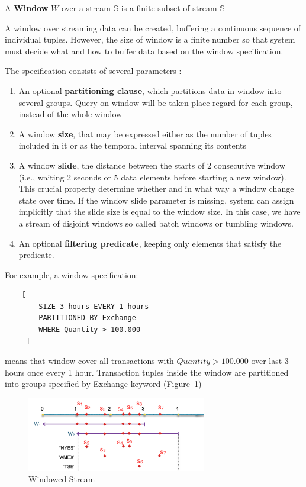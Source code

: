 \begin{defi}
A \textbf{Window} $W$ \cite{Dindar:2013} over a stream $\mathbb{S}$ is a finite subset of stream $\mathbb{S}$ 
\end{defi}


A window over streaming data can be created, buffering a continuous sequence of individual tuples. However, the size of window is a finite number so that system must decide what and how to buffer data based on the window specification. 

The specification consists of several parameters :
\begin{enumerate}
\item An optional \textbf{partitioning clause}, which partitions data in window into several groups. Query on window will be taken place regard for each group, instead of the whole window
\item A window \textbf{size}, that may be expressed either as the number of tuples included in it or as the temporal interval spanning its contents
\item A window \textbf{slide}, the distance between the starts of 2 consecutive window (i.e., waiting 2 seconds or 5 data elements before starting a new window). This crucial property determine whether and in what way a window change state over time. If the window slide parameter is missing, system can  assign implicitly that the slide size is equal to the window size. In this case, we have a stream of disjoint windows so called batch windows or tumbling windows.
\item An optional \textbf{filtering predicate}, keeping only elements that satisfy the predicate.
\end{enumerate}

For example, a window specification:
\begin{lstlisting}
	[
		SIZE 3 hours EVERY 1 hours 
	 	PARTITIONED BY Exchange
	 	WHERE Quantity > 100.000
	 ]
\end{lstlisting}
means that window cover all transactions with $Quantity > 100.000$ over last 3 hours once every 1 hour. Transaction tuples inside the window are partitioned into groups specified by Exchange keyword (Figure~\ref{fig:winSpec})

\begin{figure}[htbp!] 
\centering    
\includegraphics[width=0.7\textwidth]{winSpec}
\caption{Windowed Stream}
\label{fig:winSpec}
\end{figure}

